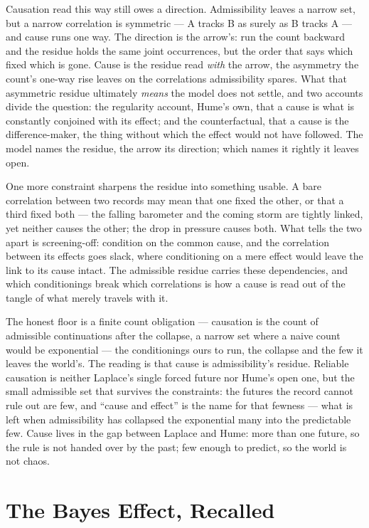 Causation read this way still owes a direction. Admissibility leaves a narrow set, but a narrow correlation is
symmetric --- A tracks B as surely as B tracks A --- and cause runs one way. The direction is the arrow's: run
the count backward and the residue holds the same joint occurrences, but the order that says which fixed which
is gone. Cause is the residue read \emph{with} the arrow, the asymmetry the count's one-way rise leaves on the
correlations admissibility spares. What that asymmetric residue ultimately \emph{means} the model does not
settle, and two accounts divide the question: the regularity account, Hume's own, that a cause is what is
constantly conjoined with its effect; and the counterfactual, that a cause is the difference-maker, the
thing without which the effect would not have followed. The model names the residue, the arrow its direction; which
names it rightly it leaves open.

One more constraint sharpens the residue into something usable. A bare correlation between two records may mean
that one fixed the other, or that a third fixed both --- the falling barometer and the coming storm are tightly
linked, yet neither causes the other; the drop in pressure causes both. What tells the two apart is
screening-off: condition on the common cause, and the correlation between its effects goes slack, where
conditioning on a mere effect would leave the link to its cause intact. The admissible residue carries these
dependencies, and which conditionings break which correlations is how a cause is read out of the tangle of what
merely travels with it.

The honest floor is a finite count obligation --- causation is the count of admissible continuations after the
collapse, a narrow set where a naive count would be exponential --- the conditionings ours to run, the collapse
and the few it leaves the world's. The reading is that cause is admissibility's
residue. Reliable causation is neither Laplace's single forced future nor Hume's open one, but the small
admissible set that survives the constraints: the futures the record cannot rule out are few, and ``cause and
effect'' is the name for that fewness --- what is left when admissibility has collapsed the exponential many
into the predictable few. Cause lives in the gap between Laplace and Hume: more than one future, so the rule is
not handed over by the past; few enough to predict, so the world is not chaos.

\section{The Bayes Effect, Recalled}
\label{se:bayes-recalled}

